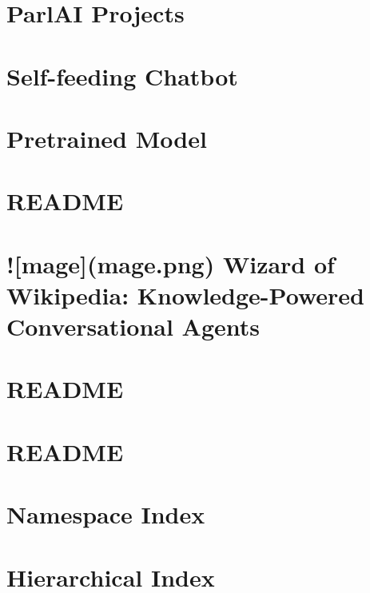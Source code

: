 \documentclass[twoside]{book}
\newcommand{\+}{\discretionary{\mbox{\scriptsize$\hookleftarrow$}}{}{}}
\begin{document}
\chapter{Parl\+AI Projects}
\label{md_projects_README}

\chapter{Self-\/feeding Chatbot}
\label{md_projects_self_feeding_README}

\chapter{Pretrained Model}
\label{md_projects_twitter_seq2seq_README}

\chapter{R\+E\+A\+D\+ME}
\label{md_projects_wizard_of_wikipedia_mturk_evaluation_task_README}

\chapter{!\mbox{[}mage\mbox{]}(mage.\+png) Wizard of Wikipedia\+: Knowledge-\/\+Powered Conversational Agents}
\label{md_projects_wizard_of_wikipedia_README}

\chapter{R\+E\+A\+D\+ME}
\label{md_README}

\chapter{R\+E\+A\+D\+ME}
\label{md_website_README}

\chapter{Namespace Index}

\chapter{Hierarchical Index}

\end{document}
